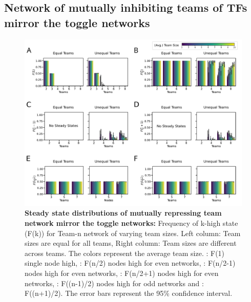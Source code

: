 \documentclass[11pt,a4paper]{article}
\theoremstyle{definition}
\theoremstyle{remark}
\begin{document}
\subsection{Network of mutually inhibiting teams of TFs mirror the toggle networks}
\begin{figure}[!ht]
    \centering
    \begin{subfigure}[c]{\textwidth}
        \label{F1-team}
    \end{subfigure}
    \begin{subfigure}[c]{\textwidth}
        \label{Fn2-team}
    \end{subfigure}
    \begin{subfigure}[c]{\textwidth}
        \label{Fn2-1-team}
    \end{subfigure}
    \begin{subfigure}[c]{\textwidth}
        \label{Fn2+1-team}
    \end{subfigure}
    \begin{subfigure}[c]{\textwidth}
        \label{Fn-12-team}
    \end{subfigure}
    \begin{subfigure}[c]{\textwidth}
        \label{Fn+12-team}
    \end{subfigure}
    \includegraphics[width=\textwidth]{figures/Figure5}
    \caption{\textbf{Steady state distributions of mutually repressing team network mirror the toggle networks:} Frequency of k-high state (F(k)) for Team-n network of varying team sizes. Left column: Team sizes are equal for all teams, Right column: Team sizes are different across teams. The colors represent the average team size. : F(1) single node high, : F(n/2) nodes high for even networks, : F(n/2-1) nodes high for even networks, : F(n/2+1) nodes high for even networks, : F((n-1)/2) nodes high for odd networks and : F((n+1)/2). The error bars represent the 95\% confidence interval.}
    \label{team-n}
\end{figure}
\end{document}

